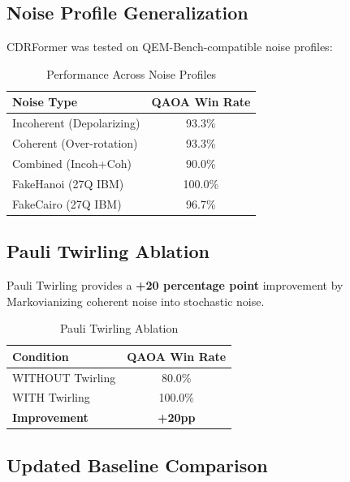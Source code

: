 \documentclass[11pt, a4paper]{article}
\begin{document}
\subsection{Noise Profile Generalization}

CDRFormer was tested on QEM-Bench-compatible noise profiles:

\begin{table}[H]
\centering
\caption{Performance Across Noise Profiles}
\begin{tabular}{@{}lc@{}}
\toprule
\textbf{Noise Type} & \textbf{QAOA Win Rate} \\ \midrule
Incoherent (Depolarizing) & 93.3\% \\
Coherent (Over-rotation) & 93.3\% \\
Combined (Incoh+Coh) & 90.0\% \\
FakeHanoi (27Q IBM) & 100.0\% \\
FakeCairo (27Q IBM) & 96.7\% \\
\bottomrule
\end{tabular}
\end{table}

\subsection{Pauli Twirling Ablation}

\begin{keyinsight}
Pauli Twirling provides a \textbf{+20 percentage point} improvement by Markovianizing coherent noise into stochastic noise.
\end{keyinsight}

\begin{table}[H]
\centering
\caption{Pauli Twirling Ablation}
\begin{tabular}{@{}lc@{}}
\toprule
\textbf{Condition} & \textbf{QAOA Win Rate} \\ \midrule
WITHOUT Twirling & 80.0\% \\
WITH Twirling & 100.0\% \\
\textbf{Improvement} & \textbf{+20pp} \\
\bottomrule
\end{tabular}
\end{table}

\subsection{Updated Baseline Comparison}
\end{document}
